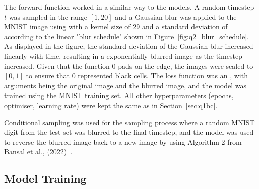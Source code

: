 The forward function worked in a similar way to the  models.
A random timestep $t$ was sampled in the range $[1, 20]$ and a Gaussian blur was applied to the MNIST image using
 with a kernel size of 29 and a standard deviation of according to the
linear "blur schedule" shown in Figure~\eqref{fig:q2_blur_schedule}.
As displayed in the figure, the standard deviation of the Gaussian blur increased linearly with time, resulting in a
exponentially blurred image as the timestep increased.
Given that the  function 0-pads on the edge, the images were scaled to $[0, 1]$ to ensure that
0 represented black cells.
The loss function was an , with arguments being the original image and the blurred image, and the
model was trained using the MNIST training set.
All other hyperparameters (epochs, optimiser, learning rate) were kept the same as in Section~\eqref{sec:q1bc}.

Conditional sampling was used for the sampling process where a random MNIST digit from the test set was blurred to the
final timestep, and the model was used to reverse the blurred image back to a new image by using Algorithm 2 from
Bansal et al., (2022)~\cite{bansal}.

\subsection{Model Training}\label{subsec:model-training}
